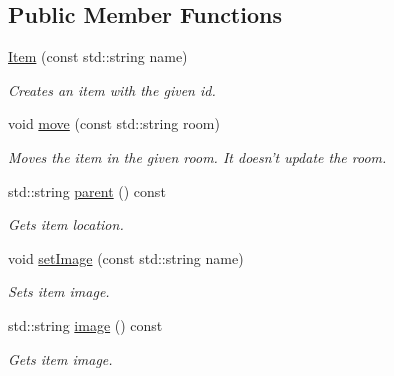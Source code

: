 \subsection*{Public Member Functions}
\begin{DoxyCompactItemize}
\item 
\hypertarget{classItem_a3ab21fc51f4712660e7cd27c9345939d}{
\hyperlink{classItem_a3ab21fc51f4712660e7cd27c9345939d}{Item} (const std::string name)}
\label{classItem_a3ab21fc51f4712660e7cd27c9345939d}

\begin{DoxyCompactList}\small\item\em Creates an item with the given id. \item\end{DoxyCompactList}\item 
\hypertarget{classItem_a72170beef42da16a4ee42091524a6839}{
void \hyperlink{classItem_a72170beef42da16a4ee42091524a6839}{move} (const std::string room)}
\label{classItem_a72170beef42da16a4ee42091524a6839}

\begin{DoxyCompactList}\small\item\em Moves the item in the given room. It doesn't update the room. \item\end{DoxyCompactList}\item 
\hypertarget{classItem_ae1d82a545452c87948b10acb33167671}{
std::string \hyperlink{classItem_ae1d82a545452c87948b10acb33167671}{parent} () const }
\label{classItem_ae1d82a545452c87948b10acb33167671}

\begin{DoxyCompactList}\small\item\em Gets item location. \item\end{DoxyCompactList}\item 
\hypertarget{classItem_a0830505c3eddaf6d72f236058699b81e}{
void \hyperlink{classItem_a0830505c3eddaf6d72f236058699b81e}{setImage} (const std::string name)}
\label{classItem_a0830505c3eddaf6d72f236058699b81e}

\begin{DoxyCompactList}\small\item\em Sets item image. \item\end{DoxyCompactList}\item 
\hypertarget{classItem_a9a3644b6827b251c81d1310faaa6d12d}{
std::string \hyperlink{classItem_a9a3644b6827b251c81d1310faaa6d12d}{image} () const }
\label{classItem_a9a3644b6827b251c81d1310faaa6d12d}

\begin{DoxyCompactList}\small\item\em Gets item image. \item\end{DoxyCompactList}\end{DoxyCompactItemize}


